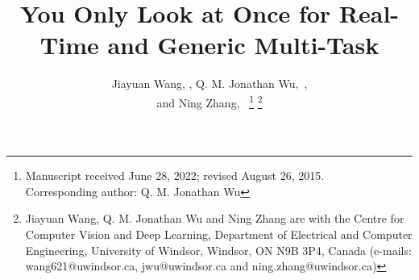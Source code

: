 \documentclass[lettersize,journal]{IEEEtran}
\begin{document}
\title{You Only Look at Once for Real-Time and Generic Multi-Task}

\author{Jiayuan Wang, , Q. M. Jonathan Wu,~,\\ and Ning Zhang,~
\thanks{Manuscript received June 28, 2022; revised August 26, 2015.\\
Corresponding author: Q. M. Jonathan Wu }
\thanks{Jiayuan Wang, Q. M. Jonathan Wu and Ning Zhang are with the Centre for Computer Vision and Deep Learning, Department of Electrical and Computer Engineering, University of Windsor, Windsor, ON N9B 3P4, Canada (e-mails: wang621@uwindsor.ca, jwu@uwindsor.ca and ning.zhang@uwindsor.ca)}}

\end{document}
